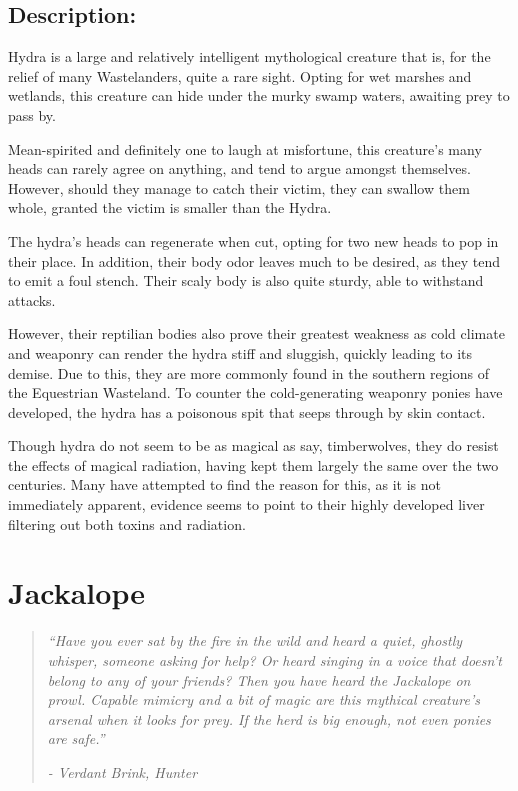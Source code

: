 \documentclass[11pt,a4paper,twocolumn]{book}
\begin{document}
	\subsection*{Description:}
	Hydra is a large and relatively intelligent mythological creature that is, for the relief of many Wastelanders, quite a rare sight. Opting for wet marshes and wetlands, this creature can hide under the murky swamp waters, awaiting prey to pass by.
	
	Mean-spirited and definitely one to laugh at misfortune, this creature's many heads can rarely agree on anything, and tend to argue amongst themselves. However, should they manage to catch their victim, they can swallow them whole, granted the victim is smaller than the Hydra.
	
	\bigskip
	The hydra's heads can regenerate when cut, opting for two new heads to pop in their place. In addition, their body odor leaves much to be desired, as they tend to emit a foul stench. Their scaly body is also quite sturdy, able to withstand attacks.
	
	However, their reptilian bodies also prove their greatest weakness as cold climate and weaponry can render the hydra stiff and sluggish, quickly leading to its demise. Due to this, they are more commonly found in the southern regions of the Equestrian Wasteland.
	To counter the cold-generating weaponry ponies have developed, the hydra has a poisonous spit that seeps through by skin contact. 
	
	Though hydra do not seem to be as magical as say, timberwolves, they do resist the effects of magical radiation, having kept them largely the same over the two centuries. Many have attempted to find the reason for this, as it is not immediately apparent, evidence seems to point to their highly developed liver filtering out both toxins and radiation. 
	
	\clearpage
	
	\section*{Jackalope}
	\begin{quote}
		\emph{``Have you ever sat by the fire in the wild and heard a quiet, ghostly whisper, someone asking for help? Or heard singing in a voice that doesn't belong to any of your friends? Then you have heard the Jackalope on prowl. Capable mimicry and a bit of magic are this mythical creature's arsenal when it looks for prey. If the herd is big enough, not even ponies are safe.''}
		
		\emph{-	Verdant Brink, Hunter}
	\end{quote}
	
\end{document}
